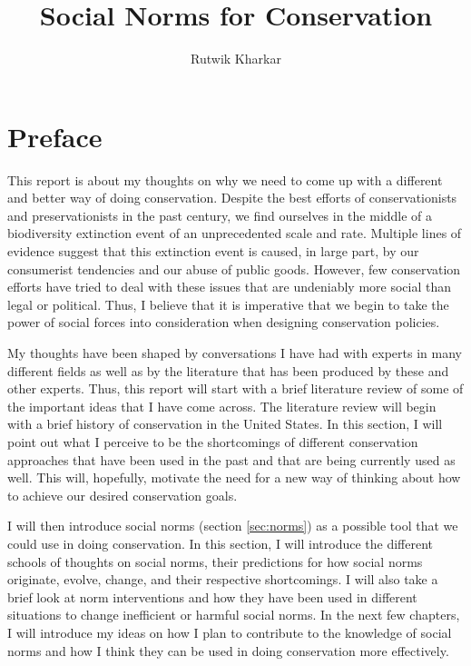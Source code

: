 \documentclass{report}
\title{Social Norms for Conservation}
\author{Rutwik Kharkar}
\begin{document}
\maketitle

\section*{Preface}

This report is about my thoughts on why we need to come up with a different and better way of doing conservation. Despite the best efforts of conservationists and preservationists in the past century, we find ourselves in the middle of a biodiversity extinction event of an unprecedented scale and rate. Multiple lines of evidence suggest that this extinction event is caused, in large part, by our consumerist tendencies and our abuse of public goods. However, few conservation efforts have tried to deal with these issues that are undeniably more social than legal or political. Thus, I believe that it is imperative that we begin to take the power of social forces into consideration when designing conservation policies.

My thoughts have been shaped by conversations I have had with experts in many different fields as well as by the literature that has been produced by these and other experts. Thus, this report will start with a brief literature review of some of the important ideas that I have come across. The literature review will begin with a brief history of conservation in the United States. In this section, I will point out what I perceive to be the shortcomings of different conservation approaches that have been used in the past and that are being currently used as well. This will, hopefully, motivate the need for a new way of thinking about how to achieve our desired conservation goals.

I will then introduce social norms (section \ref{sec:norms}) as a possible tool that we could use in doing conservation. In this section, I will introduce the different schools of thoughts on social norms, their predictions for how social norms originate, evolve, change, and their respective shortcomings. I will also take a brief look at norm interventions and how they have been used in different situations to change inefficient or harmful social norms. In the next few chapters, I will introduce my ideas on how I plan to contribute to the knowledge of social norms and how I think they can be used in doing conservation more effectively. 
\end{document}
